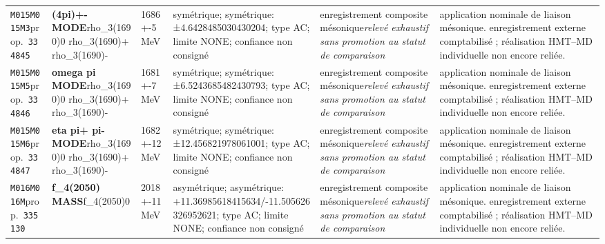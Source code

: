\begin{landscape}
\begin{longtable}{L{1.85cm}L{4.45cm}L{2.35cm}L{4.05cm}L{3.35cm}L{7.15cm}}
\texttt{M015}\newline \texttt{M015M3}\newline prop.\ \texttt{334845} & \textbf{(4pi)+- MODE}\newline rho\_\allowbreak{}3(1690)0 \textbar{}\allowbreak{} rho\_\allowbreak{}3(1690)+ \textbar{}\allowbreak{} rho\_\allowbreak{}3(1690)- & 1686+-5\,MeV & symétrique; symétrique: ±4.6428485030430204; type AC; limite NONE; confiance non consigné & enregistrement composite mésonique\newline \emph{relevé exhaustif sans promotion au statut de comparaison} & application nominale de liaison mésonique. enregistrement externe comptabilisé ; réalisation HMT--MD individuelle non encore reliée. \\
\texttt{M015}\newline \texttt{M015M5}\newline prop.\ \texttt{334846} & \textbf{omega pi MODE}\newline rho\_\allowbreak{}3(1690)0 \textbar{}\allowbreak{} rho\_\allowbreak{}3(1690)+ \textbar{}\allowbreak{} rho\_\allowbreak{}3(1690)- & 1681+-7\,MeV & symétrique; symétrique: ±6.5243685482430793; type AC; limite NONE; confiance non consigné & enregistrement composite mésonique\newline \emph{relevé exhaustif sans promotion au statut de comparaison} & application nominale de liaison mésonique. enregistrement externe comptabilisé ; réalisation HMT--MD individuelle non encore reliée. \\
\texttt{M015}\newline \texttt{M015M6}\newline prop.\ \texttt{334847} & \textbf{eta pi+ pi- MODE}\newline rho\_\allowbreak{}3(1690)0 \textbar{}\allowbreak{} rho\_\allowbreak{}3(1690)+ \textbar{}\allowbreak{} rho\_\allowbreak{}3(1690)- & 1682+-12\,MeV & symétrique; symétrique: ±12.456821978061001; type AC; limite NONE; confiance non consigné & enregistrement composite mésonique\newline \emph{relevé exhaustif sans promotion au statut de comparaison} & application nominale de liaison mésonique. enregistrement externe comptabilisé ; réalisation HMT--MD individuelle non encore reliée. \\
\texttt{M016}\newline \texttt{M016M}\newline prop.\ \texttt{335130} & \textbf{f\_\allowbreak{}4(2050) MASS}\newline f\_\allowbreak{}4(2050)0 & 2018+-11\,MeV & asymétrique; asymétrique: +11.36985618415634/-11.505626326952621; type AC; limite NONE; confiance non consigné & enregistrement composite mésonique\newline \emph{relevé exhaustif sans promotion au statut de comparaison} & application nominale de liaison mésonique. enregistrement externe comptabilisé ; réalisation HMT--MD individuelle non encore reliée. \\

\end{longtable}
\end{landscape}
